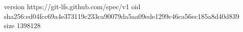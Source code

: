 version https://git-lfs.github.com/spec/v1
oid sha256:ed04fcc69a4e373119c233ca90079da5aa09ede1299c46ca56ec185a8d40d839
size 1398128
